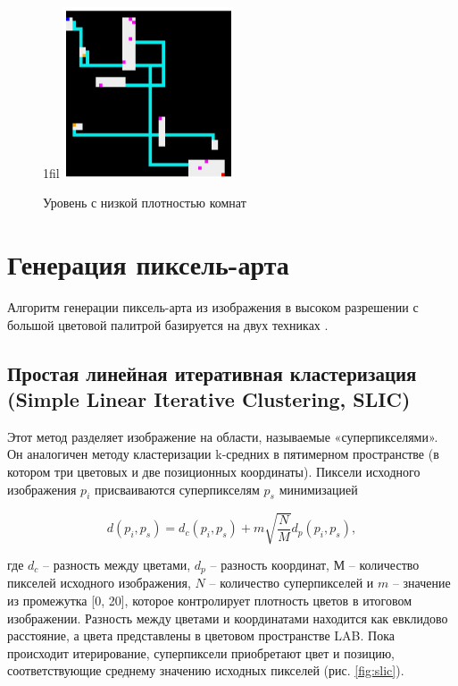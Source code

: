 \documentclass[a4paper,12pt]{report}
\makeatletter
\theoremstyle{remark}
\newcommand*{\centerfloat}{%
  \parindent \z@
  \leftskip \z@ \@plus 1fil \@minus \textwidth
  \rightskip\leftskip
  \parfillskip \z@skip}
\makeatother
\begin{document}
\begin{figure}
    \centerfloat
    \includegraphics[width=0.45\textwidth]{levels/6.jpg}
    \caption{Уровень с низкой плотностью комнат}
    \label{fig:bsp-impl2}
\end{figure}

\chapter{Генерация пиксель-арта}

\parindent=1cm
Алгоритм генерации пиксель-арта из изображения в высоком разрешении с большой цветовой палитрой базируется на двух техниках \citep{pixel}.

\section{Простая линейная итеративная кластеризация (Simple Linear Iterative Clustering, SLIC)}

Этот метод разделяет изображение на области, называемые «суперпикселями»\citep{slic}. Он аналогичен методу кластеризации k-средних в пятимерном пространстве (в котором три цветовых и две позиционных координаты). Пиксели исходного изображения $p_i$ присваиваются суперпикселям $p_s$ минимизацией

\begin{equation}
d(p_i, p_s) = d_c(p_i, p_s) + m \sqrt{\frac{N}{M}}d_p(p_i, p_s),
\end{equation}

где $d_c$ – разность между цветами, $d_p$ – разность координат, $М$ – количество пикселей исходного изображения, $N$ – количество суперпикселей и $m$ – значение из промежутка [0, 20], которое контролирует плотность цветов в итоговом изображении. Разность между цветами и координатами находится как евклидово расстояние, а цвета представлены в цветовом пространстве LAB. Пока происходит итерирование, суперпиксели приобретают цвет и позицию, соответствующие среднему значению исходных пикселей (рис. \ref{fig:slic}).
\end{document}
